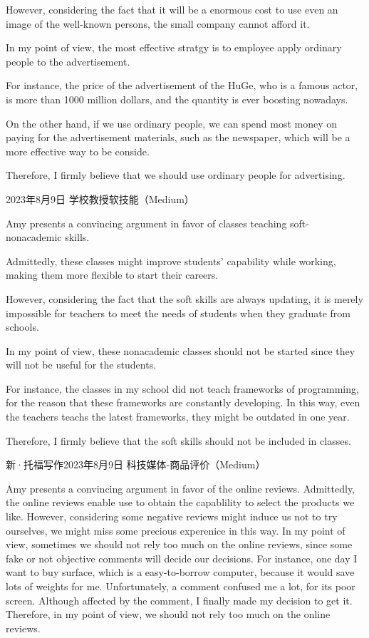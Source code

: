 However, considering the fact that it will be a enormous cost to use even an image of the well-known persons, the small company cannot afford it.

In my point of view, the most effective stratgy is to employee apply ordinary people to the advertisement.

For instance, the price of the advertisement of the HuGe, who is a famous actor, is more than 1000 million dollars, and the quantity is ever boosting nowadays.

On the other hand, if we use ordinary people, we can spend most money on paying for the advertisement materials, such as the newspaper, which will be a more effective way to be conside.

Therefore, I firmly believe that we should use ordinary people for advertising.

2023年8月9日 学校教授软技能（Medium）

Amy presents a convincing argument in favor of classes teaching soft-nonacademic skills.

Admittedly, these classes might improve students' capability while working, making them more flexible to start their careers.

However, considering the fact that the soft skills are always updating, it is merely impossible for teachers to meet the needs of students when they graduate from schools.

In my point of view, these nonacademic classes should not be started since they will not be useful for the students.

For instance, the classes in my school did not teach frameworks of programming, for the reason that these frameworks are constantly developing. In this way, even the teachers teachs the latest frameworks, they might be outdated in one year.

Therefore, I firmly believe that the soft skills should not be included in classes.

新·托福写作2023年8月9日 科技媒体-商品评价（Medium）

Amy presents a convincing argument in favor of the online reviews. Admittedly, the online reviews enable use to obtain the capablility to select the products we like. However, considering some negative reviews might induce us not to try ourselves, we might miss some precious experenice in this way. In my point of view, sometimes we should not rely too much on the online reviews, since some fake or not objective comments will decide our decisions. For instance, one day I want to buy surface, which is a easy-to-borrow computer, because it would save lots of weights for me. Unfortunately, a comment confused me a lot, for its poor screen. Although affected by the comment, I finally made my decision to get it. Therefore, in my point of view, we should not rely too much on the online reviews.

